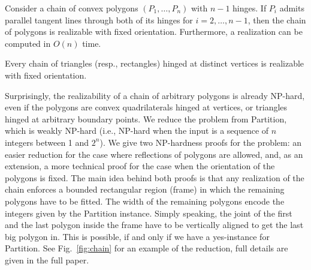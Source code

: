\documentclass[runningheads]{article}
\begin{document}
\begin{proposition}\label{pp:chain}
Consider a chain of convex polygons $(P_1,\ldots , P_n)$ with $n-1$ hinges.
If $P_i$ admits parallel tangent lines through both of its hinges for $i=2,\ldots ,n-1$,
then the chain of polygons is realizable with fixed orientation. Furthermore, a
realization can be computed in $O(n)$ time.
\end{proposition}
%
%
\begin{corollary}\label{cor:chain}
Every chain of triangles (resp., rectangles) hinged at distinct vertices is realizable with fixed orientation.
\end{corollary}

Surprisingly, the realizability of a chain of arbitrary polygons is already NP-hard, even if the polygons are convex quadrilaterals hinged at vertices, or triangles hinged at arbitrary boundary points. We reduce the problem from {\sc Partition}, which is weakly NP-hard (i.e., NP-hard when the input is a sequence of $n$ integers between 1 and $2^n$). We give two
NP-hardness proofs for the problem: an easier reduction for the case where reflections of polygons are allowed, and, as an extension,  a more technical proof for the case when the orientation of the polygons is fixed. The main idea behind both proofs is
that any realization of the chain enforces a bounded rectangular region (frame) in which the remaining polygons have to be fitted. The width
of the remaining polygons encode the integers given by the {\sc Partition} instance. Simply speaking, the joint of the first and the
last polygon inside the frame have to be vertically aligned to get the last big polygon in. This is possible, if and only if we have a yes-instance for {\sc Partition}. See Fig.~\ref{fig:chain} for an example of the reduction, full details are given in the full paper.%
\end{document}
